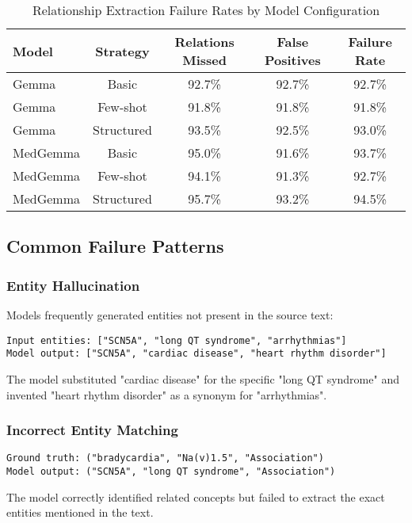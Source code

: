 \begin{table}[htbp]
\centering
\caption{Relationship Extraction Failure Rates by Model Configuration}
\label{tab:failure-rates}
\begin{tabular}{lcccc}
\toprule
\textbf{Model} & \textbf{Strategy} & \textbf{Relations Missed} & \textbf{False Positives} & \textbf{Failure Rate} \\
\midrule
Gemma & Basic & 92.7\% & 92.7\% & 92.7\% \\
Gemma & Few-shot & 91.8\% & 91.8\% & 91.8\% \\
Gemma & Structured & 93.5\% & 92.5\% & 93.0\% \\
MedGemma & Basic & 95.0\% & 91.6\% & 93.7\% \\
MedGemma & Few-shot & 94.1\% & 91.3\% & 92.7\% \\
MedGemma & Structured & 95.7\% & 93.2\% & 94.5\% \\
\bottomrule
\end{tabular}
\end{table}

\subsection{Common Failure Patterns}

\subsubsection{Entity Hallucination}
Models frequently generated entities not present in the source text:
\begin{verbatim}
Input entities: ["SCN5A", "long QT syndrome", "arrhythmias"]
Model output: ["SCN5A", "cardiac disease", "heart rhythm disorder"]
\end{verbatim}

The model substituted "cardiac disease" for the specific "long QT syndrome" and invented "heart rhythm disorder" as a synonym for "arrhythmias".

\subsubsection{Incorrect Entity Matching}
\begin{verbatim}
Ground truth: ("bradycardia", "Na(v)1.5", "Association")
Model output: ("SCN5A", "long QT syndrome", "Association")
\end{verbatim}

The model correctly identified related concepts but failed to extract the exact entities mentioned in the text.

